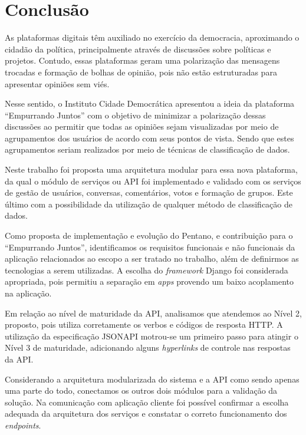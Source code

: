 \chapter{Conclusão} \label{cap:consideracoes_finais}

  As plataformas digitais têm auxiliado no exercício da democracia, aproximando o cidadão da política, principalmente
  através de discussões sobre políticas e projetos. Contudo,
  essas plataformas geram uma polarização das mensagens trocadas e formação de bolhas de opinião, 
  pois não estão estruturadas para apresentar opiniões sem viés.
  
  Nesse sentido, o Instituto Cidade Democrática apresentou a ideia da plataforma ``Empurrando Juntos'' com o objetivo
  de minimizar a polarização dessas discussões ao permitir que todas as opiniões sejam visualizadas por meio de agrupamentos
  dos usuários de acordo com seus pontos de vista. Sendo que estes agrupamentos seriam realizados por meio de técnicas 
  de classificação de dados.

  Neste trabalho foi proposta uma arquitetura modular para essa nova plataforma, da qual o módulo de serviços ou API
  foi implementado e validado com os serviços de gestão de usuários, 
  conversas, comentários, votos e formação de grupos. Este último com a possibilidade da utilização de qualquer método 
  de classificação de dados.
  
  Como proposta de implementação e evolução do Pentano, e contribuição para o ``Empurrando Juntos'',
  identificamos os requisitos funcionais e não funcionais da aplicação
  relacionados ao escopo a ser tratado no trabalho, além
  de definirmos as tecnologias a serem utilizadas. A escolha do \textit{framework} Django foi considerada apropriada, pois permitiu
  a separação em \textit{apps} provendo um baixo acoplamento na aplicação. 
  
  Em relação ao nível de maturidade da API, analisamos que atendemos ao Nível 2, proposto,
  pois utiliza corretamente os verbos e códigos de resposta HTTP.
  A utilização da especificação JSONAPI motrou-se um primeiro passo para atingir o Nível 3 de maturidade,
  adicionando alguns \textit{hyperlinks} de controle nas respostas da API.
  
  Considerando a arquitetura modularizada do sistema e a API como sendo apenas uma parte do todo, 
  conectamos os outros dois módulos para a validação 
  da solução. Na comunicação com aplicação cliente foi possível confirmar a escolha adequada da arquitetura dos serviços e 
  constatar o correto funcionamento dos \textit{endpoints}.
  
